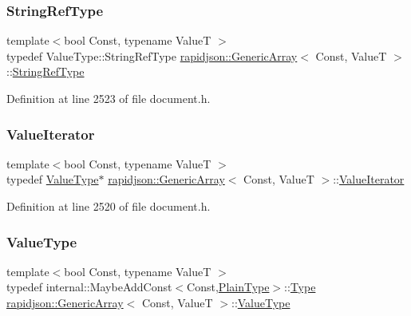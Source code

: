 \subsubsection{\texorpdfstring{StringRefType}{StringRefType}}
{\footnotesize\ttfamily template$<$bool Const, typename ValueT $>$ \\
typedef Value\+Type\+::\+String\+Ref\+Type \mbox{\hyperlink{classrapidjson_1_1_generic_array}{rapidjson\+::\+Generic\+Array}}$<$ Const, ValueT $>$\+::\mbox{\hyperlink{classrapidjson_1_1_generic_array_ad52689025256c94097a0e7bb1c70620e}{String\+Ref\+Type}}}



Definition at line 2523 of file document.\+h.

\mbox{\label{classrapidjson_1_1_generic_array_ae94140e6dbab05cd3918d3e75819dc0a}} 
\subsubsection{\texorpdfstring{ValueIterator}{ValueIterator}}
{\footnotesize\ttfamily template$<$bool Const, typename ValueT $>$ \\
typedef \mbox{\hyperlink{classrapidjson_1_1_generic_array_aebd828a2f020262b41af908fbb28a571}{Value\+Type}}$\ast$ \mbox{\hyperlink{classrapidjson_1_1_generic_array}{rapidjson\+::\+Generic\+Array}}$<$ Const, ValueT $>$\+::\mbox{\hyperlink{classrapidjson_1_1_generic_array_ae94140e6dbab05cd3918d3e75819dc0a}{Value\+Iterator}}}



Definition at line 2520 of file document.\+h.

\mbox{\label{classrapidjson_1_1_generic_array_aebd828a2f020262b41af908fbb28a571}} 
\subsubsection{\texorpdfstring{ValueType}{ValueType}}
{\footnotesize\ttfamily template$<$bool Const, typename ValueT $>$ \\
typedef internal\+::\+Maybe\+Add\+Const$<$Const,\mbox{\hyperlink{classrapidjson_1_1_generic_array_a417eefa7bd2a3d357e947e64044f0bd9}{Plain\+Type}}$>$\+::\mbox{\hyperlink{namespacerapidjson_ae79a4751c1c460ff0de5ecc07874f3e4}{Type}} \mbox{\hyperlink{classrapidjson_1_1_generic_array}{rapidjson\+::\+Generic\+Array}}$<$ Const, ValueT $>$\+::\mbox{\hyperlink{classrapidjson_1_1_generic_array_aebd828a2f020262b41af908fbb28a571}{Value\+Type}}}




